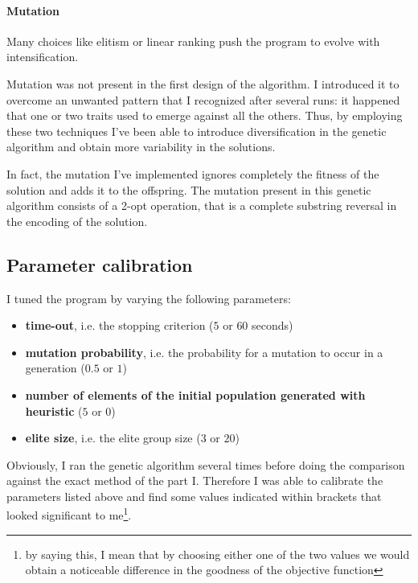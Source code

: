 \paragraph{Mutation} Many choices like elitism or linear ranking push the
program to evolve with intensification.

Mutation was not present in the first design of the algorithm. I introduced it
to overcome an unwanted pattern that I recognized after several runs: it
happened that one or two traits used to emerge against all the others. Thus, by employing these two techniques I've been able to introduce diversification
in the genetic algorithm and obtain more variability in the solutions.

In fact, the mutation I've implemented ignores completely the fitness of the
solution and adds it to the offspring. The mutation present in this genetic
algorithm consists of a 2-opt operation, that is a complete substring reversal
in the encoding of the solution.

\subsection{Parameter calibration}

I tuned the program by varying the following parameters:

\begin{itemize}
	\item \textbf{time-out}, i.e. the stopping criterion ($5$ or $60$ seconds)
	\item \textbf{mutation probability}, i.e. the probability for a mutation to
		occur in a generation ($0.5$ or $1$)
	\item \textbf{number of elements of the initial population generated with
		heuristic} ($5$ or $0$)
	\item \textbf{elite size}, i.e. the elite group size ($3$ or $20$)
\end{itemize}

Obviously, I ran the genetic algorithm several times before doing the
comparison against the exact method of the part I. Therefore I was able to
calibrate the parameters listed above and find some values indicated within
brackets that looked significant to me\footnote{by saying this, I mean that
by choosing either one of the two values we would obtain a noticeable
difference in the goodness of the objective function}.





